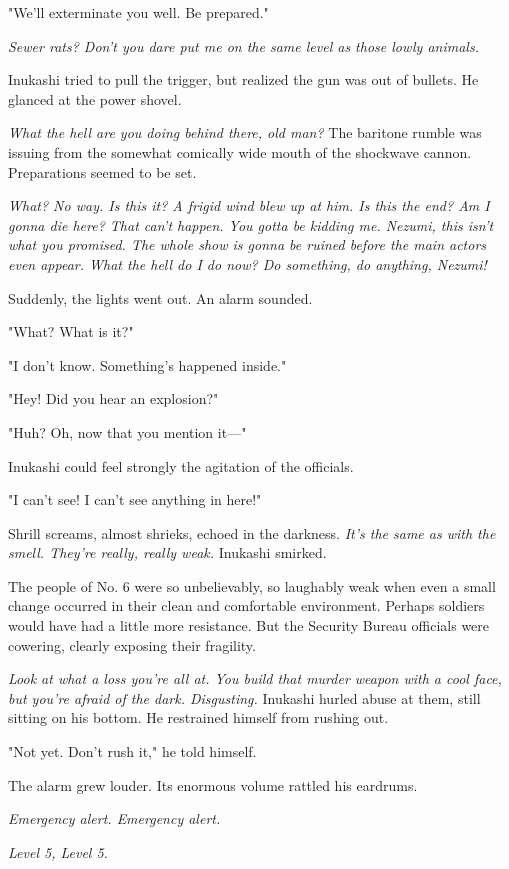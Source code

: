 "We'll exterminate you well. Be prepared."

\emph{Sewer rats? Don't you dare put me on the same level as those lowly
animals.}

Inukashi tried to pull the trigger, but realized the gun was out of
bullets. He glanced at the power shovel.

\emph{What the hell are you doing behind there, old man?} The baritone rumble
was issuing from the somewhat comically wide mouth of the shockwave
cannon. Preparations seemed to be set.

\emph{What? No way. Is this it? A frigid wind blew up at him. Is this the end?
Am I gonna die here? That can't happen. You gotta be kidding me. Nezumi,
this isn't what you promised. The whole show is gonna be ruined before
the main actors even appear. What the hell do I do now? Do something, do
anything, Nezumi!}

Suddenly, the lights went out. An alarm sounded.

"What? What is it?"

"I don't know. Something's happened inside."

"Hey! Did you hear an explosion?"

"Huh? Oh, now that you mention it---"

Inukashi could feel strongly the agitation of the officials.

"I can't see! I can't see anything in here!"

Shrill screams, almost shrieks, echoed in the darkness. \emph{It's the same as
with the smell. They're really, really weak.} Inukashi smirked.

The people of No. 6 were so unbelievably, so laughably weak when even a
small change occurred in their clean and comfortable environment.
Perhaps soldiers would have had a little more resistance. But the
Security Bureau officials were cowering, clearly exposing their
fragility.

\emph{Look at what a loss you're all at. You build that murder weapon with a
cool face, but you're afraid of the dark. Disgusting.} Inukashi hurled
abuse at them, still sitting on his bottom. He restrained himself from
rushing out.

"Not yet. Don't rush it," he told himself.

The alarm grew louder. Its enormous volume rattled his eardrums.

\emph{Emergency alert. Emergency alert.}

\emph{Level 5, Level 5.}


